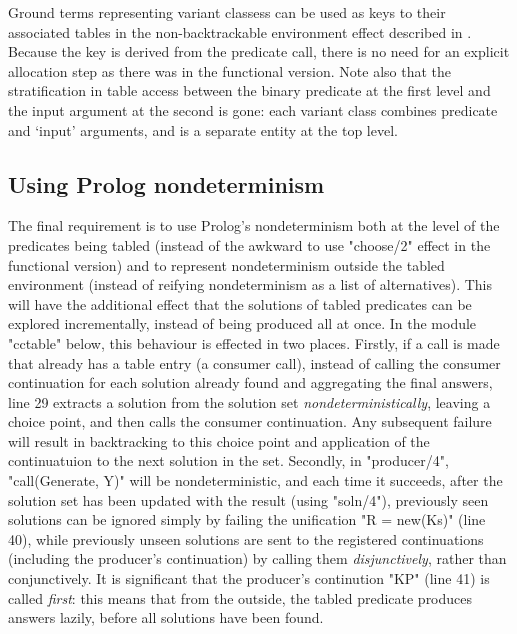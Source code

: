 Ground terms representing variant classess can be
used as keys to their associated tables in the non-backtrackable environment effect 
described in . Because the key is derived from the predicate call, there is no need
for an explicit allocation step as there was in the functional version. Note also that the
stratification in table access between the binary predicate at the first level
and the input argument at the second is gone: each variant class combines predicate
and `input' arguments, and is a separate entity at the top level.

\subsection{Using Prolog nondeterminism}

The final requirement is to use Prolog's nondeterminism both at the level of the predicates
being tabled (instead of the awkward to use "choose/2" effect in the functional version)
and to represent nondeterminism outside the tabled environment (instead of reifying nondeterminism
as a list of alternatives). This will have the additional effect that the solutions of tabled
predicates can be explored incrementally, instead of being produced all at once.
In the module "cctable" below, this behaviour is effected in two places. Firstly, if a call is made
that already has a table entry (\ie a consumer call), instead of calling the consumer continuation
for each solution already found and aggregating the final answers, line 29 extracts a solution
from the solution set \emph{nondeterministically}, leaving a choice point, and then calls
the consumer continuation. Any subsequent failure will result in backtracking to this choice
point and application of the continuatuion to the next solution in the set.
Secondly, in "producer/4", "call(Generate, Y)" will be nondeterministic, and each time it succeeds,
after the solution set has been updated with the result (using "soln/4"), previously
seen solutions can be ignored simply by failing the unification "R = new(Ks)" (line 40),
while previously unseen solutions are sent to the registered continuations (including the producer's
continuation) by calling them \emph{disjunctively}, rather than conjunctively. It is significant that
the producer's continution "KP" (line 41) is called \emph{first}: this means that from the outside,
the tabled predicate produces answers lazily, before all solutions have been found.

